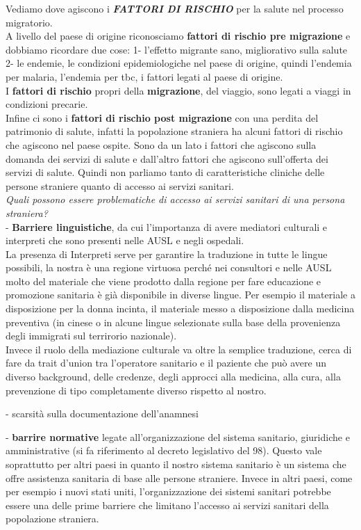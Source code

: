 \documentclass[]{article}
\begin{document}
Vediamo dove agiscono i \textbf{\emph{FATTORI DI RISCHIO}} per la salute
nel processo migratorio.\\
A livello del paese di origine riconosciamo \textbf{fattori di rischio
pre migrazione} e dobbiamo ricordare due cose: 1- l'effetto migrante
sano, migliorativo sulla salute 2- le endemie, le condizioni
epidemiologiche nel paese di origine, quindi l'endemia per malaria,
l'endemia per tbc, i fattori legati al paese di origine.\\
I \textbf{fattori di rischio} propri della \textbf{migrazione}, del
viaggio, sono legati a viaggi in condizioni precarie.\\
Infine ci sono i \textbf{fattori di rischio post migrazione} con una
perdita del patrimonio di salute, infatti la popolazione straniera ha
alcuni fattori di rischio che agiscono nel paese ospite. Sono da un lato
i fattori che agiscono sulla domanda dei servizi di salute e dall'altro
fattori che agiscono sull'offerta dei servizi di salute. Quindi non
parliamo tanto di caratteristiche cliniche delle persone straniere
quanto di accesso ai servizi sanitari.\\
\emph{Quali possono essere problematiche di accesso ai servizi sanitari
di una persona straniera?}\\
- \textbf{Barriere linguistiche}, da cui l'importanza di avere mediatori
culturali e interpreti che sono presenti nelle AUSL e negli ospedali.\\
La presenza di Interpreti serve per garantire la traduzione in tutte le
lingue possibili, la nostra è una regione virtuosa perché nei consultori
e nelle AUSL molto del materiale che viene prodotto dalla regione per
fare educazione e promozione sanitaria è già disponibile in diverse
lingue. Per esempio il materiale a disposizione per la donna incinta, il
materiale messo a disposizione dalla medicina preventiva (in cinese o in
alcune lingue selezionate sulla base della provenienza degli immigrati
sul terrirorio nazionale).\\
Invece il ruolo della mediazione culturale va oltre la semplice
traduzione, cerca di fare da trait d'union tra l'operatore sanitario e
il paziente che può avere un diverso background, delle credenze, degli
approcci alla medicina, alla cura, alla prevenzione di tipo
completamente diverso rispetto al nostro.

- scarsità sulla documentazione dell'anamnesi

- \textbf{barrire normative} legate all'organizzazione del sistema
sanitario, giuridiche e amministrative (si fa riferimento al decreto
legislativo del 98). Questo vale soprattutto per altri paesi in quanto
il nostro sistema sanitario è un sistema che offre assistenza sanitaria
di base alle persone straniere. Invece in altri paesi, come per esempio
i nuovi stati uniti, l'organizzazione dei sistemi sanitari potrebbe
essere una delle prime barriere che limitano l'accesso ai servizi
sanitari della popolazione straniera.
\end{document}
